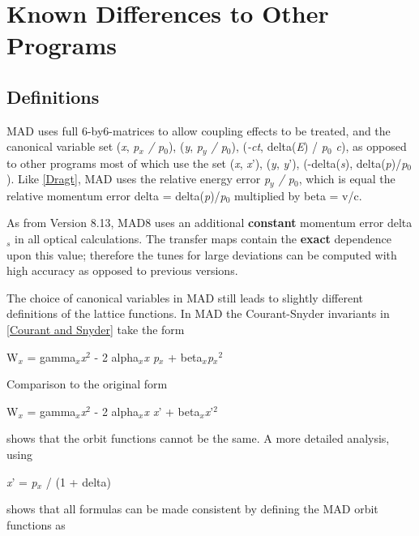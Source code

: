 
\chapter{Known Differences to Other Programs}

\section{Definitions} 

MAD uses full 6-by6-matrices to allow coupling effects to be treated,
and the canonical variable set (\textit{x}, \textit{p$_x$ / p$_0$}),
(\textit{y}, \textit{p$_y$ / p$_0$}), (\textit{-ct}, delta(\textit{E}) /
\textit{p$_0$ c}), as opposed to other programs most of which use the
set (\textit{x}, \textit{x}'), (\textit{y}, \textit{y}'),
(-delta(\textit{s}), delta(\textit{p})/\textit{p$_0$}). Like
\href{bibliography.html#dragt}{[Dragt]}, MAD uses the relative energy
error \textit{p$_y$ / p$_0$}, which is equal the relative momentum error
delta = delta(\textit{p})/\textit{p$_0$} multiplied by beta = v/c.  

As from Version 8.13, MAD8 uses an additional \textbf{constant} momentum
error delta$_\textit{s}$ in all optical calculations. The transfer maps
contain the \textbf{exact} dependence upon this value; therefore the
tunes for large deviations can be computed with high accuracy as opposed
to previous versions.  

The choice of canonical variables in MAD still leads to slightly
different definitions of the lattice functions. In MAD the
Courant-Snyder invariants in \href{bibliography.html#courant}{[Courant
    and Snyder]} take the form  

W$_x$ = gamma$_\textit{x}$\textit{x}$^2$ - 2 alpha$_\textit{x}$\textit{x
  p$_x$} + beta$_\textit{x}$\textit{p$_x$}$^2$ 

Comparison to the original form 

 W$_x$ = gamma$_\textit{x}$\textit{x}$^2$ - 2
 alpha$_\textit{x}$\textit{x x}' + beta$_\textit{x}$\textit{x}'$^2$ 

shows that the orbit functions cannot be the same. A more detailed analysis, using 

\textit{x}' = \textit{p$_x$} / (1 + delta) 

shows that all formulas can be made consistent by defining the MAD orbit
functions as  
 
